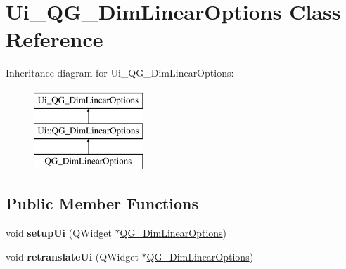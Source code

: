 \hypertarget{classUi__QG__DimLinearOptions}{\section{Ui\-\_\-\-Q\-G\-\_\-\-Dim\-Linear\-Options Class Reference}
\label{classUi__QG__DimLinearOptions}
}
Inheritance diagram for Ui\-\_\-\-Q\-G\-\_\-\-Dim\-Linear\-Options\-:\begin{figure}[H]
\begin{center}
\leavevmode
\includegraphics[height=3.000000cm]{classUi__QG__DimLinearOptions}
\end{center}
\end{figure}
\subsection*{Public Member Functions}
\begin{DoxyCompactItemize}
\item 
\hypertarget{classUi__QG__DimLinearOptions_a398b2b7066ff92a8252a60d3500bc0f6}{void {\bfseries setup\-Ui} (Q\-Widget $\ast$\hyperlink{classQG__DimLinearOptions}{Q\-G\-\_\-\-Dim\-Linear\-Options})}\label{classUi__QG__DimLinearOptions_a398b2b7066ff92a8252a60d3500bc0f6}

\item 
\hypertarget{classUi__QG__DimLinearOptions_acbd6b67acd631bda4a850394164ed69a}{void {\bfseries retranslate\-Ui} (Q\-Widget $\ast$\hyperlink{classQG__DimLinearOptions}{Q\-G\-\_\-\-Dim\-Linear\-Options})}\label{classUi__QG__DimLinearOptions_acbd6b67acd631bda4a850394164ed69a}

\end{DoxyCompactItemize}
